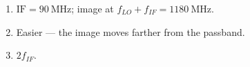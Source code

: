 \begin{enumerate}[leftmargin=1.6em,itemsep=2pt]
\item $\text{IF} = 90\ \text{MHz}$; image at $f_{LO} + f_{IF} = 1180\ \text{MHz}$.
\item Easier --- the image moves farther from the passband.
\item $2f_{IF}$.
\end{enumerate}
